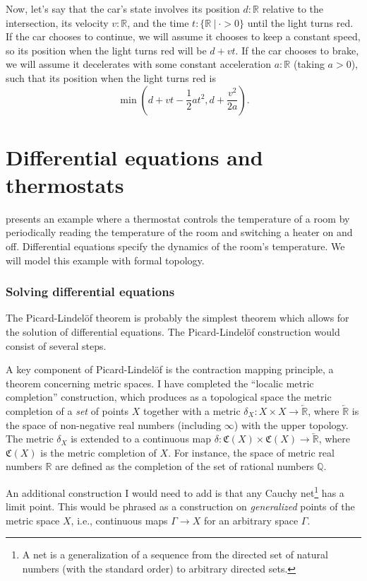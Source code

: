 \documentclass{article}           %
\newcommand{\R}{\mathbb{R}}
\newcommand{\rat}{\mathbb{Q}}
\newcommand{\suchthat}{\ |\ }
\newcommand{\upperT}[1]{\overleftarrow{#1}}
\begin{document}
Now, let's say that the car's state involves its position $d : \R$ relative to the intersection, its velocity $v : \R$, and the time $t : \{ \R \suchthat \cdot > 0 \}$ until the light turns red. If the car chooses to continue, we will assume it chooses to keep a constant speed, so its position when the light turns red will be $d + v t$. If the car chooses to brake, we will assume it decelerates with some constant acceleration $a : \R$ (taking $a > 0$), such that its position when the light turns red is
\[
\min\left(  d + vt - \frac{1}{2}a t^2, d + \frac{v^2}{2a} \right).
\]


\section{Differential equations and thermostats}

\cite{smooth-interp} presents an example where a thermostat controls the temperature of a room by periodically reading the temperature of the room and switching a heater on and off.  Differential equations specify the dynamics of the room's temperature. We will model this example with formal topology.

\subsubsection{Solving differential equations}

The Picard-Lindelöf theorem is probably the simplest theorem which allows for the solution of differential equations. The Picard-Lindelöf construction would consist of several steps.

A key component of Picard-Lindelöf is the contraction mapping principle, a theorem concerning metric spaces. I have completed the ``localic metric completion'' construction, which produces as a topological space the metric completion of a \emph{set} of points $X$ together with a metric $\delta_X : X \times X \to \upperT{\R}$, where $\upperT{\R}$ is the space of non-negative real numbers (including $\infty$) with the upper topology. The metric $\delta_X$ is extended to a continuous map $\delta : \mathfrak{C}(X) \times \mathfrak{C}(X) \to \upperT{\R}$, where $\mathfrak{C}(X)$ is the metric completion of $X$.
For instance, the space of metric real numbers $\R$ are defined as the completion of the set of rational numbers $\rat$.

An additional construction I would need to add is that any Cauchy net\footnote{A net is a generalization of a sequence from the directed set of natural numbers (with the standard order) to arbitrary directed sets.} has a limit point. This would be phrased as a construction on \emph{generalized} points of the metric space $X$, i.e., continuous maps $\Gamma \to X$ for an arbitrary space $\Gamma$.
\end{document}
